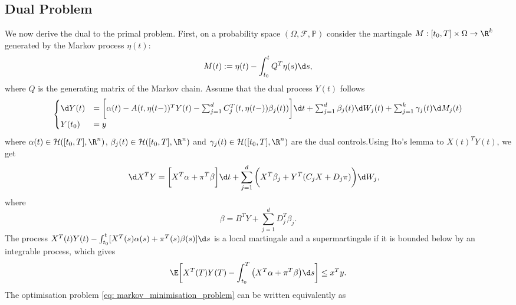 

\subsection{Dual Problem}

We now derive the dual to the primal problem. First, on a probability space $(\Omega, \mathcal{F}, \mathbb{P})$ consider the martingale $M :[t_0, T] \times \Omega \to \R^k$ generated by the Markov process $\eta(t)$:
\begin{equation*}
    M(t) := \eta(t) - \int_{t_0}^t Q^T \eta(s) \d s,
\end{equation*}
where $Q$ is the generating matrix of the Markov chain. Assume that the dual process $Y(t)$ follows
\begin{align}
\begin{cases}
    \d Y(t) &= \bigg[ \alpha(t) - A(t,\eta(t-))^T Y(t) - \sum_{j=1}^d C_j^T(t,\eta(t-)) \beta_j(t)) \bigg]\d t + \sum_{j=1}^d \beta_j(t) \d W_j(t) + \sum_{j=1}^k \gamma_j(t) \d M_j(t)\\
    Y(t_0) &= y
\end{cases}
\label{eq: markov_sde_y}
\end{align}
where $\alpha(t) \in \mathcal{H}([t_0, T], \R^n)$, $\beta_j(t) \in \mathcal{H}([t_0, T], \R^n)$ and $\gamma_j(t) \in \mathcal{H}([t_0, T], \R^n)$ are the dual controls.Using Ito's lemma to $X(t)^T Y(t)$, we get
\begin{align*}
    \d X^T Y &= \bigg[X^T \alpha + \pi^T \beta \bigg] \d t + \sum_{j=1}^d \bigg(X^T \beta_j + Y^T (C_j X + D_j \pi)\bigg) \d W_j,
\end{align*}
where
\begin{equation*}
    \beta = B^T Y +  \sum_{j=1}^d D_j^T \beta_j.
\end{equation*}
The process $X^T(t)Y(t) - \int_{t_0}^t [X^T(s) \alpha(s) + \pi^T(s) \beta(s)] \d s$ is a local martingale and a supermartingale if it is bounded below by an integrable process, which gives 
\begin{equation}
    \E \bigg[ X^T(T) Y(T) - \int_{t_0}^T \big(X^T \alpha + \pi^T \beta \big) \d s \bigg] \le x^T y. \label{eq: markov_dual_1}
\end{equation}
The optimisation problem \eqref{eq: markov_minimisation_problem} can be written equivalently as 
